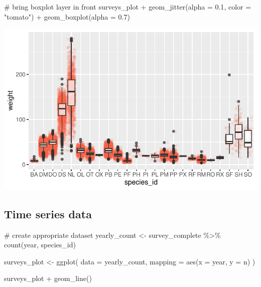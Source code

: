 \documentclass[
  letterpaper,
  DIV=11,
  numbers=noendperiod]{scrreprt}
\newenvironment{Shaded}{\begin{snugshade}}{\end{snugshade}}
\newcommand{\AttributeTok}[1]{\textcolor[rgb]{0.40,0.45,0.13}{#1}}
\newcommand{\CommentTok}[1]{\textcolor[rgb]{0.37,0.37,0.37}{#1}}
\newcommand{\FloatTok}[1]{\textcolor[rgb]{0.68,0.00,0.00}{#1}}
\newcommand{\FunctionTok}[1]{\textcolor[rgb]{0.28,0.35,0.67}{#1}}
\newcommand{\NormalTok}[1]{\textcolor[rgb]{0.00,0.23,0.31}{#1}}
\newcommand{\OtherTok}[1]{\textcolor[rgb]{0.00,0.23,0.31}{#1}}
\newcommand{\SpecialCharTok}[1]{\textcolor[rgb]{0.37,0.37,0.37}{#1}}
\newcommand{\StringTok}[1]{\textcolor[rgb]{0.13,0.47,0.30}{#1}}
\begin{document}
\begin{Shaded}
\begin{Highlighting}[]
\CommentTok{\# bring boxplot layer in front}
\NormalTok{surveys\_plot }\SpecialCharTok{+} \FunctionTok{geom\_jitter}\NormalTok{(}\AttributeTok{alpha =} \FloatTok{0.1}\NormalTok{, }\AttributeTok{color =} \StringTok{"tomato"}\NormalTok{) }\SpecialCharTok{+}
  \FunctionTok{geom\_boxplot}\NormalTok{(}\AttributeTok{alpha =} \FloatTok{0.7}\NormalTok{)}
\end{Highlighting}
\end{Shaded}

\includegraphics{src/notebooks/r_files/figure-pdf/unnamed-chunk-50-3.pdf}

\subsection{Time series data}\label{time-series-data}

\begin{Shaded}
\begin{Highlighting}[]
\CommentTok{\# create appropriate dataset}
\NormalTok{yearly\_count }\OtherTok{\textless{}{-}}\NormalTok{ survey\_complete }\SpecialCharTok{\%\textgreater{}\%}
  \FunctionTok{count}\NormalTok{(year, species\_id)}

\NormalTok{surveys\_plot }\OtherTok{\textless{}{-}} \FunctionTok{ggplot}\NormalTok{(}
  \AttributeTok{data =}\NormalTok{ yearly\_count,}
  \AttributeTok{mapping =} \FunctionTok{aes}\NormalTok{(}\AttributeTok{x =}\NormalTok{ year, }\AttributeTok{y =}\NormalTok{ n)}
\NormalTok{)}

\NormalTok{surveys\_plot }\SpecialCharTok{+} \FunctionTok{geom\_line}\NormalTok{()}
\end{Highlighting}
\end{Shaded}
\end{document}
